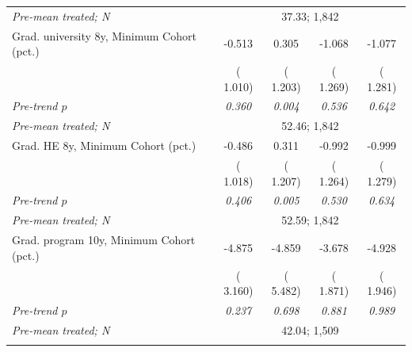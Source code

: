 \begin{tabular}{lcccc}
\quad \textit{Pre-mean treated; N} & \multicolumn{4}{c}{\scriptsize   37.33;  1,842} \\
\addlinespace
Grad. university 8y, Minimum Cohort (pct.) &  -0.513 &   0.305 &  -1.068 &  -1.077 \\
 & ( 1.010) & ( 1.203) & ( 1.269) & ( 1.281) \\
\quad \textit{Pre-trend \(p\)} & \textit{0.360} & \textit{0.004} & \textit{0.536} & \textit{0.642} \\
\quad \textit{Pre-mean treated; N} & \multicolumn{4}{c}{\scriptsize   52.46;  1,842} \\
\addlinespace
Grad. HE 8y, Minimum Cohort (pct.) &  -0.486 &   0.311 &  -0.992 &  -0.999 \\
 & ( 1.018) & ( 1.207) & ( 1.264) & ( 1.279) \\
\quad \textit{Pre-trend \(p\)} & \textit{0.406} & \textit{0.005} & \textit{0.530} & \textit{0.634} \\
\quad \textit{Pre-mean treated; N} & \multicolumn{4}{c}{\scriptsize   52.59;  1,842} \\
\addlinespace
Grad. program 10y, Minimum Cohort (pct.) &  -4.875 &  -4.859 &  -3.678\sym{**} &  -4.928\sym{**} \\
 & ( 3.160) & ( 5.482) & ( 1.871) & ( 1.946) \\
\quad \textit{Pre-trend \(p\)} & \textit{0.237} & \textit{0.698} & \textit{0.881} & \textit{0.989} \\
\quad \textit{Pre-mean treated; N} & \multicolumn{4}{c}{\scriptsize   42.04;  1,509} \\
\addlinespace
\bottomrule
\end{tabular}
